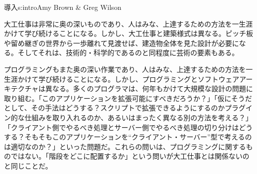 \begin{aosachapter}{導入}{s:intro}{Amy Brown \& Greg Wilson}

大工仕事は非常に奥の深いものであり、人はみな、上達するための方法を一生涯かけて学び続けることになる。しかし、大工仕事と建築様式は異なる。ピッチ板や留め継ぎの世界から一歩離れて見渡せば、建造物全体を見た設計が必要になる。そしてそれは、技術的・科学的であるのと同程度に芸術の要素もある。

プログラミングもまた奥の深い作業であり、人はみな、上達するための方法を一生涯かけて学び続けることになる。しかし、プログラミングとソフトウェアアーキテクチャは異なる。多くのプログラマは、何年もかけて大規模な設計の問題に取り組む。「このアプリケーションを拡張可能にすべきだろうか？」「仮にそうだとして、その手法はどうする？スクリプトで拡張できるようにするのかプラグイン的な仕組みを取り入れるのか、あるいはまったく異なる別の方法を考える？」「クライアント側でやるべき処理とサーバー側でやるべき処理の切り分けはどうする？そもそもこのアプリケーションを``クライアント・サーバー''型で考えるのは適切なのか？」といった問題だ。これらの問いは、プログラミングに関するものではない。「階段をどこに配置するか」という問いが大工仕事とは関係ないのと同じことだ。


\end{aosachapter}
